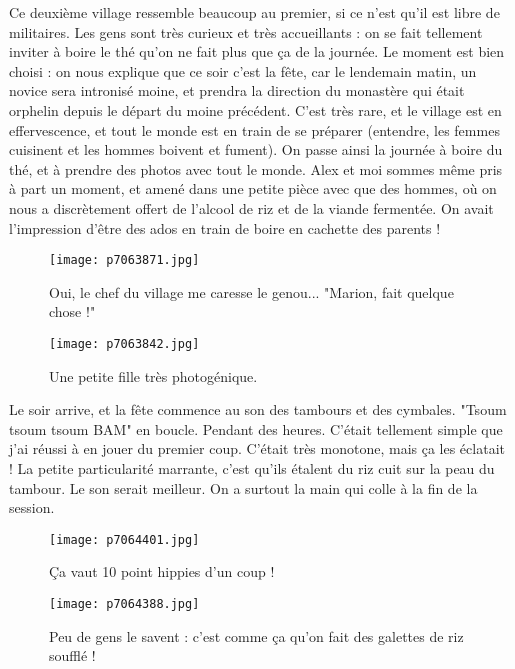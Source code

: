 \documentclass{book}
\begin{document}
Ce deuxième village ressemble beaucoup au premier, si ce n'est qu'il est libre de militaires. Les gens sont très curieux et très accueillants : on se fait tellement inviter à boire le thé qu'on ne fait plus que ça de la journée. Le moment est bien choisi : on nous explique que ce soir c'est la fête, car le lendemain matin, un novice sera intronisé moine, et prendra la direction du monastère qui était orphelin depuis le départ du moine précédent. C'est très rare, et le village est en effervescence, et tout le monde est en train de se préparer (entendre, les femmes cuisinent et les hommes boivent et fument). On passe ainsi la journée à boire du thé, et à prendre des photos avec tout le monde. Alex et moi sommes même pris à part un moment, et amené dans une petite pièce avec que des hommes, où on nous a discrètement offert de l'alcool de riz et de la viande fermentée. On avait l'impression d'être des ados en train de boire en cachette des parents !


\begin{figure}[h]
\centering
\texttt{[image: p7063871.jpg]}
\caption*{Oui, le chef du village me caresse le genou... "Marion, fait quelque chose !"}
\end{figure}


\begin{figure}[h]
\centering
\texttt{[image: p7063842.jpg]}
\caption*{Une petite fille très photogénique.}
\end{figure}

Le soir arrive, et la fête commence au son des tambours et des cymbales. "Tsoum tsoum tsoum BAM" en boucle. Pendant des heures. C'était tellement simple que j'ai réussi à en jouer du premier coup. C'était très monotone, mais ça les éclatait ! La petite particularité marrante, c'est qu'ils étalent du riz cuit sur la peau du tambour. Le son serait meilleur. On a surtout la main qui colle à la fin de la session.


\begin{figure}[h]
\centering
\texttt{[image: p7064401.jpg]}
\caption*{Ça vaut 10 point hippies d'un coup !}
\end{figure}


\begin{figure}[h]
\centering
\texttt{[image: p7064388.jpg]}
\caption*{Peu de gens le savent : c'est comme ça qu'on fait des galettes de riz soufflé !}
\end{figure}
\end{document}
